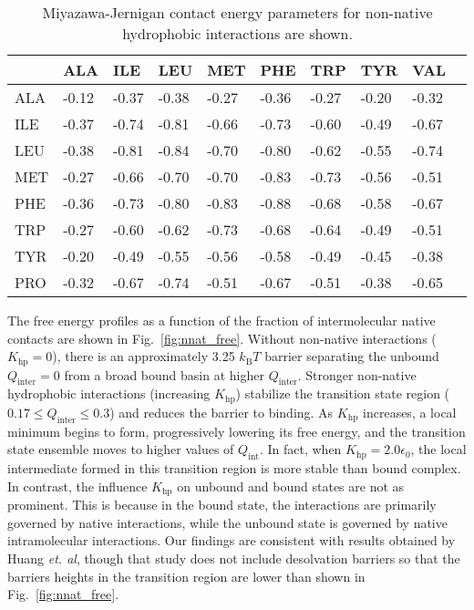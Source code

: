 \documentclass[../talant.diss.submit.tex]{subfiles}
\begin{document}
\begin{table}[t!]
  \begin{center}
    \begin{tabular}{@{}l|lllllllll@{}}
      & ALA  %
      & ILE
      & LEU
      & MET
      & PHE
      & TRP
      & TYR
      & VAL \\
      \hline
      ALA & -0.12 & -0.37 & -0.38 & -0.27 & -0.36 & -0.27 & -0.20 & -0.32 \\
      ILE & -0.37 & -0.74 & -0.81 & -0.66 & -0.73 & -0.60 & -0.49 & -0.67 \\
      LEU & -0.38 & -0.81 & -0.84 & -0.70 & -0.80 & -0.62 & -0.55 & -0.74 \\
      MET & -0.27 & -0.66 & -0.70 & -0.70 & -0.83 & -0.73 & -0.56 & -0.51 \\
      PHE & -0.36 & -0.73 & -0.80 & -0.83 & -0.88 & -0.68 & -0.58 & -0.67 \\
      TRP & -0.27 & -0.60 & -0.62 & -0.73 & -0.68 & -0.64 & -0.49 & -0.51 \\
      TYR & -0.20 & -0.49 & -0.55 & -0.56 & -0.58 & -0.49 & -0.45 & -0.38 \\
      PRO & -0.32 & -0.67 & -0.74 & -0.51 & -0.67 & -0.51 & -0.38 & -0.65 
    \end{tabular}
    \caption{Miyazawa-Jernigan contact energy parameters for non-native hydrophobic interactions
      are shown. %
    }
    \label{tab:e_nnat}
  \end{center}
\end{table}
%
%

The free energy profiles
as a function of the fraction of intermolecular native contacts are
shown in Fig.~\ref{fig:nnat_free}.
Without non-native interactions ($K_\mathrm{hp} = 0$), there is an approximately
3.25 $k_\mathrm{B}T$ barrier separating the unbound $Q_\mathrm{inter} = 0$ from
a broad bound basin at higher $Q_\mathrm{inter}$.
Stronger non-native hydrophobic interactions (increasing $K_\mathrm{hp}$)
stabilize the transition state region ($0.17 \le Q_{\mathrm{inter}} \le 0.3$)
and reduces the barrier to binding. As $K_\mathrm{hp}$ increases,
a local minimum begins to form, progressively lowering its free energy,
and the transition state ensemble moves to higher values of $Q_\mathrm{int}$.
In fact, when $K_{\mathrm{hp}} = 2.0\epsilon_0$, the local intermediate formed in this transition
region is more stable
than bound complex. In contrast, the influence $K_{\mathrm{hp}}$ on unbound and bound
states are not as prominent. This is because in the bound state, the interactions are primarily
governed by native interactions, while the unbound state is governed by native
intramolecular interactions.  Our findings are consistent with results obtained
by Huang \textit{et. al}\cite{huang:10a}, though that study does not include desolvation barriers
so that the barriers heights in the transition region are lower than shown in Fig.~\ref{fig:nnat_free}.
\end{document}
